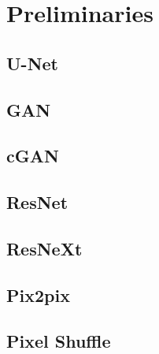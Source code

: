 \chapter{Preliminaries}
\label{chapterlabel2}

\section{U-Net}

\section{GAN}

\section{cGAN}

\section{ResNet}

\section{ResNeXt}

\section{Pix2pix}

\section{Pixel Shuffle}

